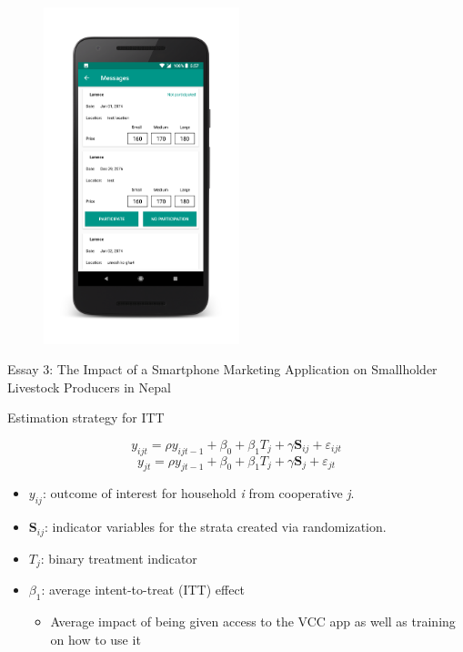 \documentclass[aspectratio=169]{beamer}
\newenvironment{wideitemize}{\itemize\addtolength{\itemsep}{10pt}}{\enditemize}
\begin{document}
\begin{frame}
\begin{figure}[!h]
\begin{minipage}{.2\textwidth}
    \includegraphics[width=5.7cm]{vcc3.png}
  \end{minipage}
\end{figure}
\end{frame}

\begin{frame}{Essay 3: The Impact of a Smartphone Marketing Application on Smallholder Livestock Producers in Nepal}

\begin{wideitemize}
    \item Estimation strategy for ITT

\begin{equation} \label{eq:ITT1}
y_{ijt} = \rho y_{ijt-1} + \beta_{0} + \beta_{1} T_{j} + \gamma \textbf{S}_{ij} + \varepsilon_{ijt}
\end{equation}
\begin{equation} \label{eq:ITT2}
y_{jt} = \rho y_{jt-1} + \beta_{0} + \beta_{1} T_{j} + \gamma \textbf{S}_{j} + \varepsilon_{jt}
\end{equation}

    \vspace{.25cm}
    \begin{itemize}
        \item $y_{ij}$: outcome of interest for household \textit{i} from cooperative \textit{j}. \item $\textbf{S}_{ij}$: indicator variables for the strata created via randomization. \item $T_{j}$: binary treatment indicator
        \item $\beta_{1}$: average intent-to-treat (ITT) effect
            \begin{itemize}
                \item Average impact of being given access to the VCC app as well as training on how to use it
            \end{itemize}
    \end{itemize}
\end{wideitemize}
\end{frame}
\end{document}
